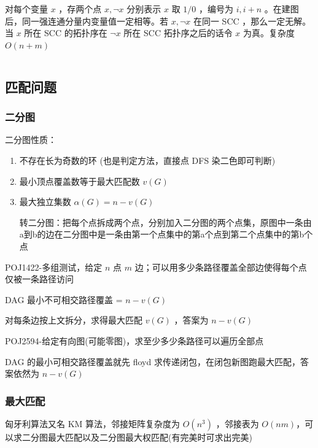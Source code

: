 \documentclass[twocolumn,10pt]{ctexart}
\begin{document}
对每个变量 $x$ ，存两个点 $x,\lnot x$ 分别表示 $x$ 取 $1/0$ ，编号为 $i,i+n$ 。在建图后，同一强连通分量内变量值一定相等。若 $x,\lnot x$ 在同一 SCC ，那么一定无解。当 $x$ 所在 SCC 的拓扑序在 $\lnot x$ 所在 SCC 拓扑序之后的话令 $x$ 为真。复杂度 $O(n+m)$

\inputminted{cpp}{code/p4782_2_sat.cpp}

\subsection{匹配问题}

\subsubsection{二分图}

二分图性质：

\begin{enumerate}
\item 不存在长为奇数的环  (也是判定方法，直接点 DFS 染二色即可判断)
\item 最小顶点覆盖数等于最大匹配数 $v(G)$
\item 最大独立集数 $\alpha(G)=n-v(G)$

转二分图：把每个点拆成两个点，分别加入二分图的两个点集，原图中一条由a到b的边在二分图中是一条由第一个点集中的第a个点到第二个点集中的第b个点
\end{enumerate}

\begin{notebox}
POJ1422-多组测试，给定 $n$ 点 $m$ 边；可以用多少条路径覆盖全部边使得每个点仅被一条路径访问
\end{notebox}

DAG 最小不可相交路径覆盖 = $n-v(G)$

对每条边按上文拆分，求得最大匹配 $v(G)$ ，答案为 $n-v(G)$

\begin{notebox}
POJ2594-给定有向图(可能零图)，求至少多少条路径可以遍历全部点
\end{notebox}

DAG 的最小可相交路径覆盖就先 floyd 求传递闭包，在闭包新图跑最大匹配，答案依然为 $n-v(G)$

\subsubsection{最大匹配}

匈牙利算法又名 KM 算法，邻接矩阵复杂度为 $O(n^3)$ ，邻接表为 $O(nm)$，可以求二分图最大匹配以及二分图最大权匹配(有完美时可求出完美)
\end{document}
